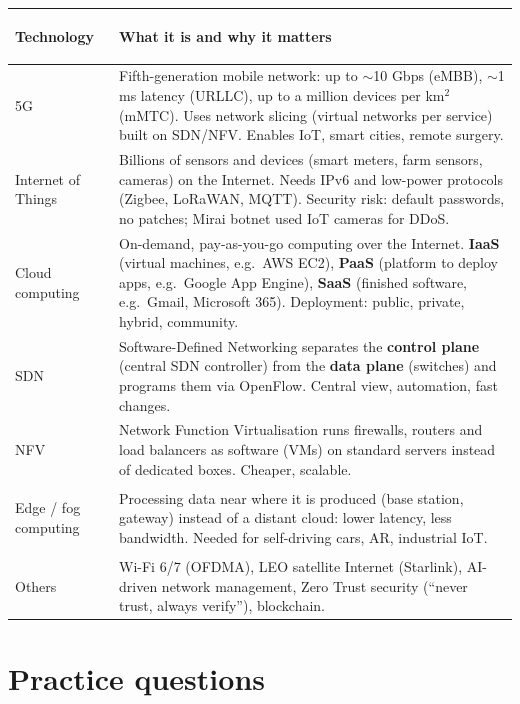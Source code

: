 \documentclass[10pt]{article}
\begin{document}
\begin{tabularx}{\linewidth}{@{}>{\bfseries\raggedright\arraybackslash}p{2.4cm}X@{}}
\toprule
Technology & What it is and why it matters\\\midrule
5G & Fifth-generation mobile network: up to $\sim$10 Gbps (eMBB), $\sim$1 ms latency (URLLC), up to a million devices per km$^2$ (mMTC). Uses network slicing (virtual networks per service) built on SDN/NFV. Enables IoT, smart cities, remote surgery.\\
Internet of Things & Billions of sensors and devices (smart meters, farm sensors, cameras) on the Internet. Needs IPv6 and low-power protocols (Zigbee, LoRaWAN, MQTT). Security risk: default passwords, no patches; Mirai botnet used IoT cameras for DDoS.\\
Cloud computing & On-demand, pay-as-you-go computing over the Internet. \textbf{IaaS} (virtual machines, e.g.\ AWS EC2), \textbf{PaaS} (platform to deploy apps, e.g.\ Google App Engine), \textbf{SaaS} (finished software, e.g.\ Gmail, Microsoft 365). Deployment: public, private, hybrid, community.\\
SDN & Software-Defined Networking separates the \textbf{control plane} (central SDN controller) from the \textbf{data plane} (switches) and programs them via OpenFlow. Central view, automation, fast changes.\\
NFV & Network Function Virtualisation runs firewalls, routers and load balancers as software (VMs) on standard servers instead of dedicated boxes. Cheaper, scalable.\\
Edge / fog computing & Processing data near where it is produced (base station, gateway) instead of a distant cloud: lower latency, less bandwidth. Needed for self-driving cars, AR, industrial IoT.\\
Others & Wi-Fi 6/7 (OFDMA), LEO satellite Internet (Starlink), AI-driven network management, Zero Trust security (``never trust, always verify''), blockchain.\\
\bottomrule
\end{tabularx}

\section{Practice questions}
\setcounter{pq}{0}
\end{document}

